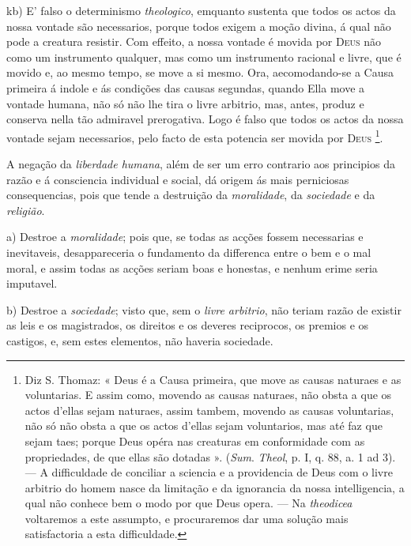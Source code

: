 kb) E' falso o determinismo \emph{theologico}, emquanto sustenta que todos os actos da nossa vontade são necessarios, porque todos exigem a moção divina, á qual não pode a creatura resistir. Com effeito, a nossa vontade é movida por \textsc{Deus} não como um instrumento qualquer, mas como um instrumento racional e livre, que é movido e, ao mesmo tempo, se move a si mesmo. Ora, aecomodando-se a Causa primeira á indole e ás condições das causas segundas, quando Ella move a vontade humana, não só não lhe tira o livre arbitrio, mas, antes, produz e conserva nella tão admiravel prerogativa. Logo é falso que todos os actos da nossa vontade sejam necessarios, pelo facto de esta potencia ser movida por \textsc{Deus} \footnote{Diz S. Thomaz: « Deus é a Causa primeira, que move as causas naturaes e as voluntarias. E assim como, movendo as causas naturaes, não obsta a que os actos d'ellas sejam naturaes, assim tambem, movendo as causas voluntarias, não só não obsta a que os actos d'ellas sejam voluntarios, mas até faz que sejam taes; porque Deus opéra nas creaturas em conformidade com as propriedades, de que ellas são dotadas ». (\emph{Sum}. \emph{Theol}, p. I, q. 88, a. 1 ad 3). --- A difficuldade de conciliar a sciencia e a providencia de Deus com o livre arbitrio do homem nasce da limitação e da ignorancia da nossa intelligencia, a qual não conhece bem o modo por que Deus opera. --- Na \emph{theodicea} voltaremos a este assumpto, e procuraremos dar uma solução mais satisfactoria a esta difficuldade.}.


 
A negação da \emph{liberdade humana}, além de ser um erro contrario aos principios da razão e á consciencia individual e social, dá origem ás mais perniciosas consequencias, pois que tende a destruição da \emph{moralidade}, da \emph{sociedade} e da \emph{religião}.

a) Destroe a \emph{moralidade}; pois que, se todas as acções fossem necessarias e inevitaveis, desappareceria o fundamento da differenca entre o bem e o mal moral, e assim todas as acções seriam boas e honestas, e nenhum erime seria imputavel.

b) Destroe a \emph{sociedade}; visto que, sem o \emph{livre arbitrio}, não teriam razão de existir as leis e os magistrados, os direitos e os deveres reciprocos, os premios e os castigos, e, sem estes elementos, não haveria sociedade.

